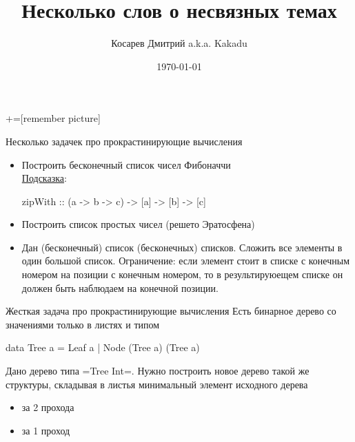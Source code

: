 \documentclass[
  xcolor={svgnames},
  hyperref={colorlinks,citecolor=DeepPink4,linkcolor=DarkRed,urlcolor=DarkBlue}]{beamer}
\title[Занятие 3]{Несколько слов о несвязных темах}
\author{Косарев Дмитрий a.k.a. Kakadu}
\institute{матмех СПбГУ}
\date{\today}
\begin{document}
\maketitle

+=[remember picture]

\everymath{\displaystyle}


\begin{frame}[fragile]{Несколько задачек про прокрастинирующие вычисления}
\begin{itemize}
 \item Построить бесконечный список чисел Фибоначчи \\ \href{https://www.haskell.org/hoogle/?hoogle=zipWith}{Подсказка}:\vspace{0.5cm}
 \begin{verbnobox}[\monacoB]
zipWith :: (a -> b -> c) -> [a] -> [b] -> [c]
 \end{verbnobox}
 \item Построить список простых чисел (решето Эратосфена)
 \item Дан (бесконечный) список (бесконечных) списков. Сложить все элементы в один большой список. Ограничение: если элемент стоит в списке с конечным номером на позиции с конечным номером, то в результируюещем списке он должен быть наблюдаем на конечной позиции.
\end{itemize}

\end{frame}

\begin{frame}[fragile]{Жесткая задача про прокрастинирующие вычисления}
Есть бинарное дерево со значениями только в листях и типом \pause
\begin{verbnobox}[\monacoB] 
data Tree a = Leaf a
            | Node (Tree a) (Tree a)
\end{verbnobox}
Дано дерево типа \hsinline=Tree Int=. Нужно построить новое дерево такой же структуры, складывая в листья минимальный элемент исходного дерева
\begin{itemize}
 \item за 2 прохода
 \item за 1 проход
\end{itemize}
\end{frame}
\end{document}
